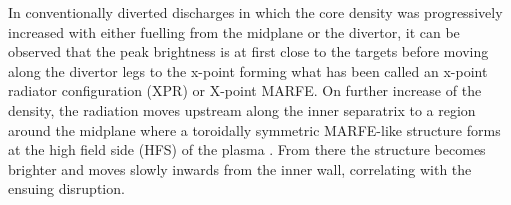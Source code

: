 
In conventionally diverted discharges\cite{Morris2018} in which the core density was progressively increased with either fuelling from the midplane or the divertor, it can be observed that the peak brightness is at first close to the targets before moving along the divertor legs to the x-point forming what has been called an x-point radiator configuration (XPR)\cite{Bernert2021} or X-point MARFE\cite{Kallenbach2015a}. On further increase of the density, the radiation moves upstream along the inner separatrix to a region around the midplane where a toroidally symmetric MARFE-like structure forms at the high field side (HFS) of the plasma \cite{Lipschultz1984}. From there the structure becomes brighter and moves slowly inwards from the inner wall, correlating with the ensuing disruption.

